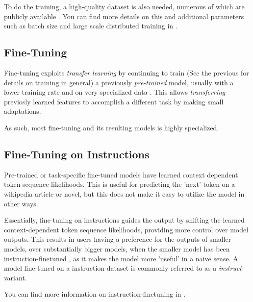 To do the training, a high-quality dataset is also needed, numerous of which are publicly available \cite{redpajamadata_2023}.
You can find more details on this and additional parameters such as batch size and large scale distributed training in \cite{tirumala_d4_2023}.

\subsection{Fine-Tuning}\label{sub:finetune}
Fine-tuning exploits \textit{transfer learning} by continuing to train (See the previous  for details on training in general) a previously \textit{pre-trained} model, usually with a lower training rate and on very specialized data \cite{gaddipati_comparative_2020}.
This allows \textit{transferring} previosly learned features to accomplish a different task by making small adaptations.

As such, most fine-tuning and its resulting models is highly specialized.

\subsection{Fine-Tuning on Instructions}\label{sub:instruct}
Pre-trained or task-specific fine-tuned  models have learned context dependent token sequence likelihoods.
This is useful for predicting the 'next' token on a wikipedia article or novel, but this does not make it easy to utilize the model in other ways.

Essentially, fine-tuning on instructions guides the output by shifting the learned context-dependent token sequence likelihoods, providing more control over model outputs.
This results in users having a preference for the outputs of smaller models, over substantially bigger models, when the smaller model has been instruction-finetuned \cite{ouyang_training_2022}, as it makes the model more 'useful' in a naive sense.
A model fine-tuned on  a instruction dataset is commonly referred to as a \textit{instruct}-variant.

You can find more information on instruction-finetuning in \cite{ouyang_training_2022, tirumala_d4_2023}.


